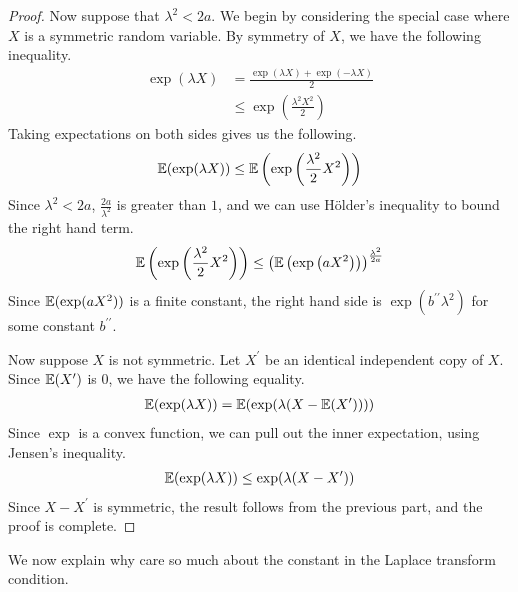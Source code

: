 \documentclass[11pt]{article}
\begin{document}
\begin{proof}
  Now suppose that $\lambda^2 < 2a$.
  We begin by considering the special case where $X$ is a symmetric random variable.
  By symmetry of $X$, we have the following inequality.
  \begin{align*}
    \exp(\lambda X) &= \frac{\exp(\lambda X) + \exp(-\lambda X)}{2} \\
            &\leq \exp\left( \frac{\lambda^2 X^2}{2} \right)
  \end{align*}
  Taking expectations on both sides gives us the following.
  \begin{align*}
    \mathbb{E}(\exp(\lambda X)) \leq \mathbb{E}\left(\exp\left( \frac{\lambda^2}{2} X^2 \right)\right)
  \end{align*}
  Since $\lambda^2 < 2a$, $\frac{2a}{\lambda^2}$ is greater than $1$, and we can use Hölder's inequality to bound the right hand term.
  \begin{align*}
    \mathbb{E}\left(\exp\left( \frac{\lambda^2}{2} X^2 \right)\right) \leq
    \left( \mathbb{E}\left(\exp\left(   aX^2   \right) \right) \right)^{\frac{\lambda^2}{2a}}
  \end{align*}
  Since $\mathbb{E}(\exp(aX^2))$ is a finite constant, the right hand side is $\exp(b^{\prime \prime} \lambda^2)$ for some constant $b^{\prime \prime}$.

  Now suppose $X$ is not symmetric.
  Let $X^{\prime}$ be an identical independent copy of $X$.
  Since $\mathbb{E}(X^{\prime})$ is $0$, we have the following equality.
  \begin{align*}
    \mathbb{E}(\exp(\lambda X)) = \mathbb{E}(\exp(\lambda (X - \mathbb{E}(X^{\prime}))))
  \end{align*}
  Since $\exp$ is a convex function, we can pull out the inner expectation, using Jensen's inequality.
  \begin{align*}
    \mathbb{E}(\exp(\lambda X)) \leq \exp(\lambda(X - X^{\prime}))
  \end{align*}
  Since $X - X^{\prime}$ is symmetric, the result follows from the previous part, and the proof is complete.
\end{proof}
We now explain why care so much about the constant in the Laplace transform condition.
\end{document}
